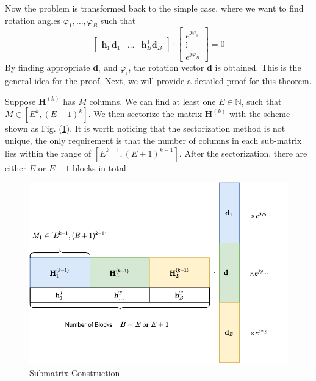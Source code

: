 \documentclass[12pt,draftclsnofoot,onecolumn,journal]{IEEEtran}
\begin{document}
Now the problem is transformed back to the simple case, where we want to find rotation angles $\varphi_1,\dots,\varphi_B$ such that
\begin{equation}
\begin{bmatrix}
\mathbf h_1^{\mathsf{T}}\mathbf d_1 &\dots &\mathbf h_B^{\mathsf{T}}\mathbf d_B
\end{bmatrix}\cdot\begin{bmatrix}
 e^{j\varphi_1}\\
 \vdots\\
e^{j\varphi_B}
\end{bmatrix}=0
\end{equation}
By finding appropriate $\mathbf d_i$ and $\varphi_i$, the rotation vector $\mathbf d$ is obtained.
This is the general idea for the proof. Next, we will provide a detailed proof for this theorem.

Suppose $\mathbf H^{(k)}$ has $M$ columns. We can find at least one $E\in\mathbb N$, such that $M\in[E^k, (E+1)^k]$. We then sectorize the matrix $\mathbf H^{(k)}$ with the scheme shown as Fig. (\ref{fig:constructfinal}). It is worth noticing that the sectorization method is not unique, the only requirement is that the number of columns in each sub-matrix lies within the range of $[E^{k-1}, (E+1)^{k-1}]$. After the sectorization, there are either $E$ or $E+1$ blocks in total.
\begin{figure}
\includegraphics[width=5.5in]{submatrixcons.pdf} 
\caption{Submatrix Construction}
\label{fig:constructfinal}
\end{figure}
\end{document}
